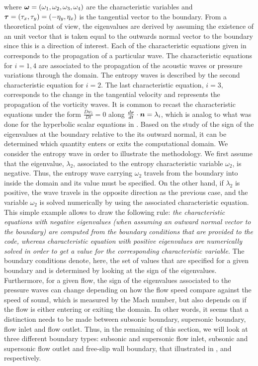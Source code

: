 %
where $\boldsymbol\omega = \left( \omega_1, \omega_2, \omega_3, \omega_4 \right)$ are the characteristic variables and $\boldsymbol\tau = \left( \tau_x, \tau_y \right) = \left( -\eta_y, \eta_x \right)$ is the tangential vector to the boundary. From a theoretical point of view, the eigenvalues are derived by assuming the existence of an unit vector that is taken equal to the outwards normal vector to the boundary since this is a direction of interest. Each of the characteristic equations given in  corresponds to the propagation of a particular wave. The characteristic equations for $i=1,4$ are associated to the propagation of the acoustic waves or pressure variations through the domain. The entropy waves is described by the second characteristic equation for $i=2$. The last characteristic equation, $i=3$, corresponds to the change in the tangential velocity and represents the propagation of the vorticity waves. It is common to recast the characteristic equations under the form $\frac{D w_i}{Dt} = 0$ along $\frac{d\boldsymbol r}{dt} \cdot \boldsymbol n = \lambda_i$, which is analog to what was done for the hyperbolic scalar equations in . Based on the study of the sign of the eigenvalues at the boundary relative to the its outward normal, it can be determined which quantity enters or exits the computational domain. We consider the entropy wave in order to illustrate the methodology. We first assume that the eigenvalue, $\lambda_2$, associated to the entropy characteristic variable $\omega_2$, is negative. Thus, the entropy wave carrying $\omega_2$ travels from the boundary into inside the domain and its value must be specified. On the other hand, if $\lambda_2$ is positive, the wave travels in the opposite direction as the previous case, and the variable $\omega_2$ is solved numerically by using the associated characteristic equation. This simple example allows to draw the following rule: \emph{the characteristic equations with negative eigenvalues (when assuming an outward normal vector to the boundary) are computed from the boundary conditions that are provided to the code, whereas characteristic equation with positive eigenvalues are numerically solved in order to get a value for the corresponding characteristic variable}. The boundary conditions denote, here, the set of values that are specified for a given boundary and is determined by looking at the sign of the eigenvalues. Furthermore, for a given flow, the sign of the eigenvalues associated to the pressure waves can change depending on how the flow speed compare against the speed of sound, which is measured by the Mach number, but also depends on if the flow is either entering or exiting the domain. In other words, it seems that a distinction needs to be made between subsonic boundary, supersonic boundary, flow inlet and flow outlet. Thus, in the remaining of this section, we will look at three different boundary types: subsonic and supersonic flow inlet, subsonic and supersonic flow outlet and free-slip wall boundary, that illustrated in ,  and  respectively.  
